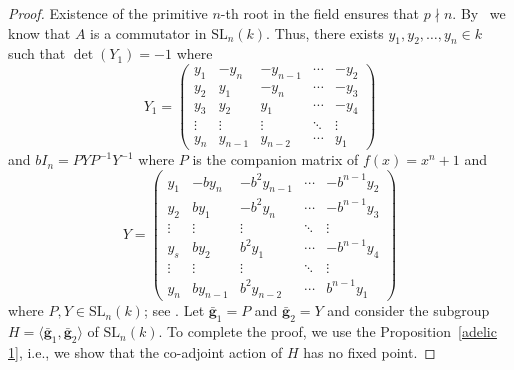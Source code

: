 \documentclass[10pt,twoside]{amsart}
\newcommand{\SL}{\mathrm{SL}}
\theoremstyle{definition}
\theoremstyle{definition}
\begin{document}
\begin{proof}
Existence of the primitive $n$-th root in the field ensures that $p\nmid n$. By~\cite[Theorem 1]{Thompson1961} we know that $A$ is a commutator in $\SL_n(k)$. Thus, there exists $y_1, y_2,\ldots, y_n \in k$ such that $\det(Y_1)=-1$ where \[
Y_1 = \begin{pmatrix}
y_1 & -y_n & -y_{n-1} & \cdots & -y_2 \\
y_2 & y_1 & -y_n & \cdots & -y_3 \\
y_3 & y_2 & y_1 & \cdots & -y_4 \\
\vdots & \vdots & \vdots & \ddots & \vdots \\
y_n & y_{n-1} & y_{n-2} & \cdots & y_1
\end{pmatrix}
\]
and  $bI_n = PYP^{-1}Y^{-1}$ where $P$ is the companion matrix of $f(x) = x^n + 1$ and 
\[ Y = \begin{pmatrix}
y_1 & -b y_n & -b^2 y_{n-1} & \cdots & -b^{n-1} y_2 \\
y_2 & b y_1 & -b^2 y_n & \cdots & -b^{n-1} y_3 \\
\vdots & \vdots & \vdots & \ddots & \vdots \\
y_s & b y_2 & b^2 y_1 & \cdots & -b^{n-1} y_4 \\
\vdots & \vdots & \vdots & \ddots & \vdots \\
y_n & b y_{n-1} & b^2 y_{n-2} & \cdots & b^{n-1} y_1
\end{pmatrix}
\] 
where $P, Y\in \SL_n(k)$; see \cite[Proof of Theorem 1]{Thompson1961}. Let $\mathbf{\bar g}_1 = P$ and $\mathbf{\bar g}_2 = Y$ and consider the subgroup $H = \langle\mathbf{\bar g}_1, \mathbf{\bar g}_2\rangle$ of $\SL_n(k)$. To complete the proof, we use the Proposition~\ref{adelic 1}, i.e., we show that the co-adjoint action of $H$ has no fixed point. 


\end{proof}
\end{document}
